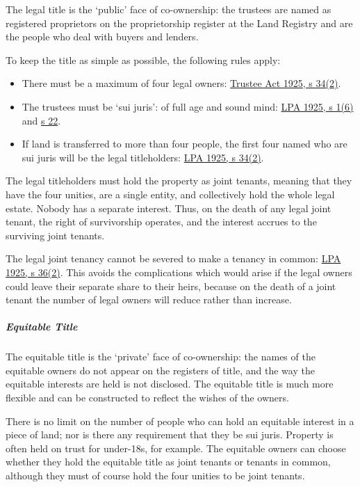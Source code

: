 \documentclass[
]{article}
\providecommand{\tightlist}{%
  \setlength{\itemsep}{0pt}\setlength{\parskip}{0pt}}
\begin{document}
The legal title is the `public' face of co-ownership: the trustees are
named as registered proprietors on the proprietorship register at the
Land Registry and are the people who deal with buyers and lenders.

To keep the title as simple as possible, the following rules apply:

\begin{itemize}
\tightlist
\item
  There must be a maximum of four legal owners:
  \href{https://www.legislation.gov.uk/ukpga/Geo5/15-16/19/section/34}{Trustee
  Act 1925, s 34(2)}.
\item
  The trustees must be `sui juris': of full age and sound mind:
  \href{https://www.legislation.gov.uk/ukpga/Geo5/15-16/20/section/1}{LPA
  1925, s 1(6)} and
  \href{https://www.legislation.gov.uk/ukpga/Geo5/15-16/20/section/22}{s
  22}.
\item
  If land is transferred to more than four people, the first four named
  who are sui juris will be the legal titleholders:
  \href{https://www.legislation.gov.uk/ukpga/Geo5/15-16/20/section/1}{LPA
  1925, s 34(2)}.
\end{itemize}

The legal titleholders must hold the property as joint tenants, meaning
that they have the four unities, are a single entity, and collectively
hold the whole legal estate. Nobody has a separate interest. Thus, on
the death of any legal joint tenant, the right of survivorship operates,
and the interest accrues to the surviving joint tenants.

The legal joint tenancy cannot be severed to make a tenancy in common:
\href{https://www.legislation.gov.uk/ukpga/Geo5/15-16/20/section/36}{LPA
1925, s 36(2)}. This avoids the complications which would arise if the
legal owners could leave their separate share to their heirs, because on
the death of a joint tenant the number of legal owners will reduce
rather than increase.

\hypertarget{equitable-title}{%
\subparagraph{Equitable Title}\label{equitable-title}}

The equitable title is the `private' face of co-ownership: the names of
the equitable owners do not appear on the registers of title, and the
way the equitable interests are held is not disclosed. The equitable
title is much more flexible and can be constructed to reflect the wishes
of the owners.

There is no limit on the number of people who can hold an equitable
interest in a piece of land; nor is there any requirement that they be
sui juris. Property is often held on trust for under-18s, for example.
The equitable owners can choose whether they hold the equitable title as
joint tenants or tenants in common, although they must of course hold
the four unities to be joint tenants.
\end{document}
